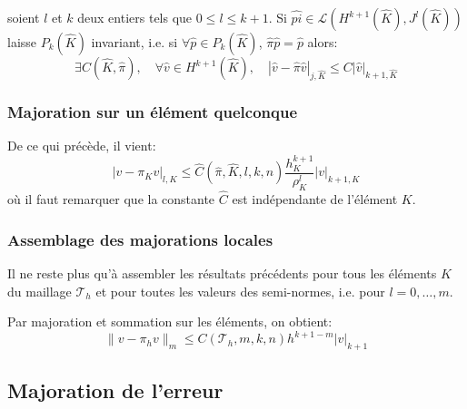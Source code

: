 \begin{theoreme}
soient $l$ et $k$ deux entiers tels que $0\le l\le k+1$.
Si $\hat{pi}\in\mathcal{L}(H^{k+1}(\hat{K}),J^l(\hat{K}))$ laisse
$P_k(\hat{K})$ invariant, i.e. si $\forall \hat{p}\in P_k(\hat{K})$, $\hat{\pi}\hat{p}=\hat{p}$ alors:
\begin{equation}
\exists C(\hat{K},\hat{\pi}),\quad \forall \hat{v}\in H^{k+1}(\hat{K}),\quad |\hat{v}-\hat{\pi}\hat{v}|_{j,\hat{K}}
\le C |\hat{v}|_{k+1,\hat{K}}
\end{equation}
\end{theoreme}

\medskip
\subsubsection{Majoration sur un élément quelconque}
De ce qui précède, il vient:
\begin{equation}
|v-\pi_Kv|_{l,K}\le \hat{C}(\hat{\pi},\hat{K},l,k,n) \dfrac{h_K^{k+1}}{\rho_K^l} |v|_{k+1,K}
\end{equation}
où il faut remarquer que la constante $\hat{C}$ est indépendante de l'élément $K$.

\medskip
\subsubsection{Assemblage des majorations locales}
Il ne reste plus qu'à assembler les résultats précédents pour tous les éléments $K$
du maillage $\mathcal{T}_h$ et pour toutes les valeurs des semi-normes, i.e. pour $l=0,\ldots, m$.
%

\medskip
Par majoration et sommation sur les éléments, on obtient:
\begin{equation}
\|v-\pi_hv\|_m\le C(\mathcal{T}_h,m,k,n) h^{k+1-m} |v|_{k+1}
\end{equation}

\normalsize
\medskip
\subsection{Majoration de l'erreur}

